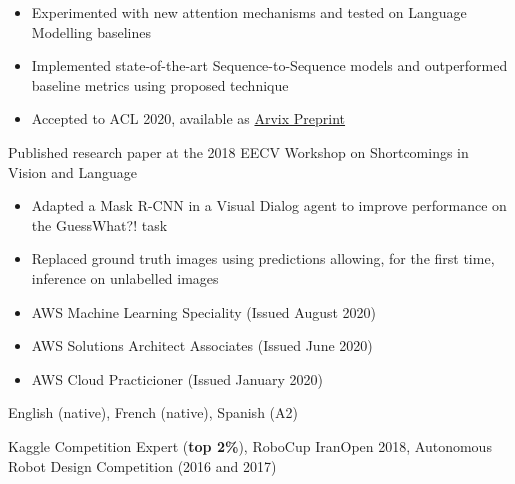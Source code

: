 \begin{itemize}
    \item Experimented with new attention mechanisms and tested on Language Modelling baselines
    \item Implemented state-of-the-art Sequence-to-Sequence models and outperformed baseline metrics using proposed technique
    \item Accepted to ACL 2020, available as \href{https://arxiv.org/abs/1911.03872}{Arvix Preprint}
\end{itemize}{}

Published research paper at the 2018 EECV Workshop on Shortcomings in Vision and Language
\begin{itemize}
    \item Adapted a Mask R-CNN in a Visual Dialog agent to improve performance on the GuessWhat?! task    
    \item Replaced ground truth images using predictions allowing, for the first time, inference on unlabelled images
\end{itemize}









\break

\begin{itemize}
    \item AWS Machine Learning Speciality (Issued August 2020)
    \item AWS Solutions Architect Associates (Issued June 2020)
    \item AWS Cloud Practicioner (Issued January 2020)
\end{itemize}

English (native), French (native), Spanish (A2)


Kaggle Competition Expert (\textbf{top 2\%}), RoboCup IranOpen 2018, Autonomous Robot Design Competition (2016 and 2017)
\clearpage

